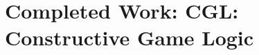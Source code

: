 \documentclass[12pt]{cmuthesis}
\theoremstyle{definition}
\theoremstyle{remark}
\newcommand{\allregion}{\mathcal{X}}
\newcommand{\CGL}{\textsf{CGL}\xspace}
\begin{document}
\chapter{Completed Work: \CGL: Constructive Game Logic}
\label{ch:cgl}
\newcommand{\projUp}[2]{{#1}\uparrow{#2}}
\newcommand{\projDown}[3]{{#1}\downarrow{#2(#3)}}
\newcommand{\projBV}[3]{\projDown{#1}{#2}{\boundvars{#3}^\complement}}
\newcommand{\sapp}[2]{#1(#2)}
\newcommand{\sadj}[2]{#1^*(#2)}
\newcommand{\spp}[1]{\sapp{\sigma}{#1}}
\newcommand{\adj}[1]{\sadj{\sigma}{#1}}
\newcommand{\drv}{\mathcal{D}}
\newcommand{\nzvar}{\textit{nz}}
\newcommand{\convvar}{\textit{cnv}}
\newcommand{\erefl}{\textsf{refl}}
\newcommand{\pstep}{\textsf{step}}
\newcommand{\modvar}{\textit{mod}}
\newcommand{\monvar}{\textsf{m}
}
\newcommand{\rangevar}{\textsf{Range}}
\newcommand{\testvar}{\textsf{test}}
\newcommand{\elem}[2]{\textsf{Dec}[#1](#2)}
\newcommand{\spc}{\hspace{0.15in}}
\newcommand{\kwmod}{\textsf{mod}}
\newcommand{\emod}[2]{#1~\kwmod~#2}
\newcommand{\kwdiv}{\textsf{div}}
\newcommand{\ediv}[2]{#1~\kwdiv~#2}
\newcommand{\kwsig}{\Sigma}
\newcommand{\sig}[1]{\kwsig(#1)}
\newcommand{\nim}{\textsc{Nim}}
\newcommand{\cake}{\textsc{CC}}
\newcommand{\interp}{I}
\newcommand{\valset}[1]{\mathfrak{V}(#1)}
\newcommand{\kwbool}{\m{\mathbb{B}}}
\newcommand{\kwint}{\m{\mathbb{Z}}}
\newcommand{\kwreal}{\m{\mathbb{R}}}
\newcommand{\kwintsig}{\Xi}
\newcommand{\intsig}[1]{\kwintsig(#1)}
\newcommand{\churchkleene}{\omega_{\text{CK}}}
\newcommand{\restL}[1]{#1_L}
\newcommand{\restR}[1]{#1_R}
\newcommand{\apL}[1]{#1_{\langle{0}\rangle}}
\newcommand{\apR}[1]{#1_{\langle{1}\rangle}}
\newcommand{\dpL}[1]{#1_{[0]}}
\newcommand{\dpR}[1]{#1_{[1]}}

\newcommand{\va}{a}
\newcommand{\vb}{b}
\newcommand{\vca}{\overline{a}}
\newcommand{\vcb}{\overline{b}}

\newcommand{\btt}{\texttt{tt}}
\newcommand{\bff}{\texttt{ff}}
\newcommand{\stt}{\top}
\newcommand{\sff}{\bot}
\newcommand{\demonactive}[2]{\textrm{aD}(#1,#2)}
\newcommand{\demondormant}[2]{\textrm{dD}(#1,#2)}
\newcommand{\sren}[3]{\urename[{#1}]{#2}{#3}}%
\newcommand{\ssub}[3]{\subst[{#1}]{#2}{#3}}
\newcommand{\eren}[3]{\urename[{#1}]{#2}{#3}}%
\newcommand{\earen}[2]{\urename[{#1}]{\boundvars{#2}}{\vec{y}}}%

\newcommand{\allcon}{\allregion}
\newcommand{\somesemi}[2]{\epsilon #1~|~#2}
\end{document}
